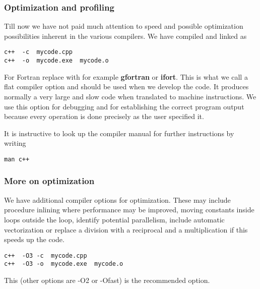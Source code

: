 \documentclass{beamer}
\begin{document}
\begin{frame}
\frametitle{Optimization and profiling}

\begin{block}{}

Till now we have not paid much attention to speed and possible optimization possibilities
inherent in the various compilers. We have compiled and linked as



\begin{verbatim}
c++  -c  mycode.cpp
c++  -o  mycode.exe  mycode.o

\end{verbatim}

For Fortran replace with for example \textbf{gfortran} or \textbf{ifort}.
This is what we call a flat compiler option and should be used when we develop the code.
It produces normally a very large and slow code when translated to machine instructions.
We use this option for debugging and for establishing the correct program output because
every operation is done precisely as the user specified it.

It is instructive to look up the compiler manual for further instructions by writing


\begin{verbatim}
man c++

\end{verbatim}


\end{block}
\end{frame}

\begin{frame}
\frametitle{More on optimization}

\begin{block}{}
We have additional compiler options for optimization. These may include procedure inlining where 
performance may be improved, moving constants inside loops outside the loop, 
identify potential parallelism, include automatic vectorization or replace a division with a reciprocal
and a multiplication if this speeds up the code.



\begin{verbatim}
c++  -O3 -c  mycode.cpp
c++  -O3 -o  mycode.exe  mycode.o

\end{verbatim}

This (other options are -O2 or -Ofast) is the recommended option. 

\end{block}
\end{frame}
\end{document}
